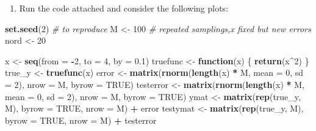 \documentclass[
]{article}
\newenvironment{Shaded}{\begin{snugshade}}{\end{snugshade}}
\newcommand{\AttributeTok}[1]{\textcolor[rgb]{0.13,0.29,0.53}{#1}}
\newcommand{\CommentTok}[1]{\textcolor[rgb]{0.56,0.35,0.01}{\textit{#1}}}
\newcommand{\ConstantTok}[1]{\textcolor[rgb]{0.56,0.35,0.01}{#1}}
\newcommand{\ControlFlowTok}[1]{\textcolor[rgb]{0.13,0.29,0.53}{\textbf{#1}}}
\newcommand{\DecValTok}[1]{\textcolor[rgb]{0.00,0.00,0.81}{#1}}
\newcommand{\FloatTok}[1]{\textcolor[rgb]{0.00,0.00,0.81}{#1}}
\newcommand{\FunctionTok}[1]{\textcolor[rgb]{0.13,0.29,0.53}{\textbf{#1}}}
\newcommand{\NormalTok}[1]{#1}
\newcommand{\OtherTok}[1]{\textcolor[rgb]{0.56,0.35,0.01}{#1}}
\newcommand{\SpecialCharTok}[1]{\textcolor[rgb]{0.81,0.36,0.00}{\textbf{#1}}}
\providecommand{\tightlist}{%
  \setlength{\itemsep}{0pt}\setlength{\parskip}{0pt}}
\begin{document}
\begin{enumerate}
\def\labelenumi{\alph{enumi})}
\setcounter{enumi}{1}
\tightlist
\item
  Run the code attached and consider the following plots:
\end{enumerate}

\begin{Shaded}
\begin{Highlighting}[]
\FunctionTok{set.seed}\NormalTok{(}\DecValTok{2}\NormalTok{) }\CommentTok{\# to reproduce}
\NormalTok{M }\OtherTok{\textless{}{-}} \DecValTok{100} \CommentTok{\# repeated samplings,x fixed but new errors}
\NormalTok{nord }\OtherTok{\textless{}{-}} \DecValTok{20}

\NormalTok{x }\OtherTok{\textless{}{-}} \FunctionTok{seq}\NormalTok{(}\AttributeTok{from =} \SpecialCharTok{{-}}\DecValTok{2}\NormalTok{, }\AttributeTok{to =} \DecValTok{4}\NormalTok{, }\AttributeTok{by =} \FloatTok{0.1}\NormalTok{)}
\NormalTok{truefunc }\OtherTok{\textless{}{-}} \ControlFlowTok{function}\NormalTok{(x) \{}
  \FunctionTok{return}\NormalTok{(x}\SpecialCharTok{\^{}}\DecValTok{2}\NormalTok{)}
\NormalTok{\}}
\NormalTok{true\_y }\OtherTok{\textless{}{-}} \FunctionTok{truefunc}\NormalTok{(x)}
\NormalTok{error }\OtherTok{\textless{}{-}} \FunctionTok{matrix}\NormalTok{(}\FunctionTok{rnorm}\NormalTok{(}\FunctionTok{length}\NormalTok{(x) }\SpecialCharTok{*}\NormalTok{ M, }\AttributeTok{mean =} \DecValTok{0}\NormalTok{, }\AttributeTok{sd =} \DecValTok{2}\NormalTok{), }\AttributeTok{nrow =}\NormalTok{ M, }\AttributeTok{byrow =} \ConstantTok{TRUE}\NormalTok{)}
\NormalTok{testerror }\OtherTok{\textless{}{-}} \FunctionTok{matrix}\NormalTok{(}\FunctionTok{rnorm}\NormalTok{(}\FunctionTok{length}\NormalTok{(x) }\SpecialCharTok{*}\NormalTok{ M, }\AttributeTok{mean =} \DecValTok{0}\NormalTok{, }\AttributeTok{sd =} \DecValTok{2}\NormalTok{), }\AttributeTok{nrow =}\NormalTok{ M, }\AttributeTok{byrow =} \ConstantTok{TRUE}\NormalTok{)}
\NormalTok{ymat }\OtherTok{\textless{}{-}} \FunctionTok{matrix}\NormalTok{(}\FunctionTok{rep}\NormalTok{(true\_y, M), }\AttributeTok{byrow =} \ConstantTok{TRUE}\NormalTok{, }\AttributeTok{nrow =}\NormalTok{ M) }\SpecialCharTok{+}\NormalTok{ error}
\NormalTok{testymat }\OtherTok{\textless{}{-}} \FunctionTok{matrix}\NormalTok{(}\FunctionTok{rep}\NormalTok{(true\_y, M), }\AttributeTok{byrow =} \ConstantTok{TRUE}\NormalTok{, }\AttributeTok{nrow =}\NormalTok{ M) }\SpecialCharTok{+}\NormalTok{ testerror}


\end{Highlighting}
\end{Shaded}
\end{document}
